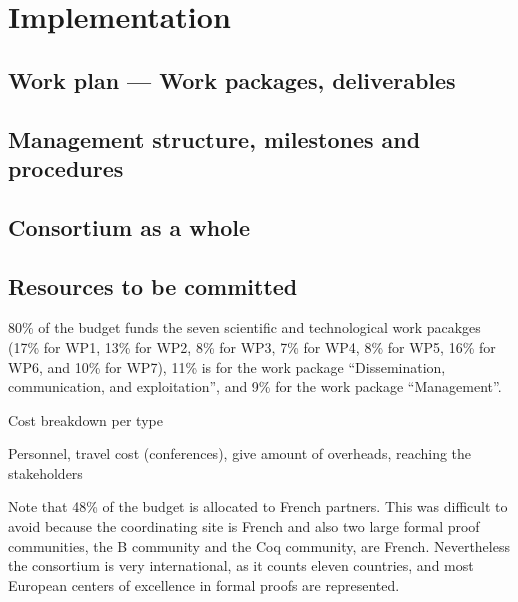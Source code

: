 \chapter{Implementation}\label{chap:implementation}

\section{Work plan --- Work packages, deliverables}



\section{Management structure, milestones and procedures}



\section{Consortium as a whole}\label{sec:consortium}



\section{Resources to be committed}\label{sec:resources}

\wpfigstyle{\scriptsize\setlength{\tabcolsep}{2pt}}
\wpfig%


80\% of the budget funds the seven scientific and technological work
pacakges (17\% for WP1, 13\% for WP2, 8\% for WP3, 7\% for WP4, 8\%
for WP5, 16\% for WP6, and 10\% for WP7), 11\% is for the work package
``Dissemination, communication, and exploitation'', and 9\% for the
work package ``Management''.

{\color{red}
Cost breakdown per type

Personnel, travel cost (conferences), give amount of overheads,
reaching the stakeholders}

Note that 48\% of the budget is allocated to French partners.  This
was difficult to avoid because the coordinating site is French and
also two large formal proof communities, the B community and the Coq
community, are French.  Nevertheless the consortium is very
international, as it counts eleven countries, and most European
centers of excellence in formal proofs are represented.


